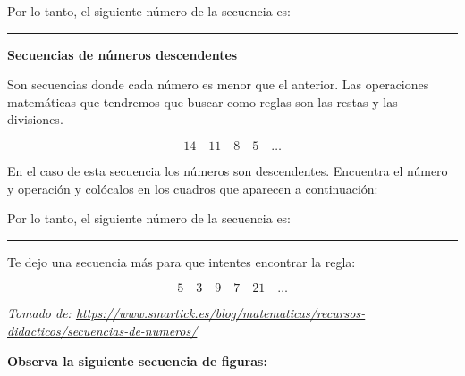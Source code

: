 \documentclass[12pt,a4paper]{article}
\begin{document}
\begin{tcolorbox}[colback=fondorosa,colframe=rojoclaro,title=MINI-EXPLICACIONES: SECUENCIAS DE NÚMEROS,breakable]
\begin{itemize}
    \vspace{0.5cm}

    Por lo tanto, el siguiente número de la secuencia es: \rule{2cm}{0.4pt}
\end{itemize}

\textbf{Secuencias de números descendentes}

Son secuencias donde cada número es menor que el anterior. Las operaciones matemáticas que tendremos que buscar como reglas son las restas y las divisiones.

\[ 14 \quad 11 \quad 8 \quad 5 \quad \ldots \]

En el caso de esta secuencia los números son descendentes. Encuentra el número y operación y colócalos en los cuadros que aparecen a continuación:

\vspace{0.5cm}

Por lo tanto, el siguiente número de la secuencia es: \rule{2cm}{0.4pt}

Te dejo una secuencia más para que intentes encontrar la regla:

\[ 5 \quad 3 \quad 9 \quad 7 \quad 21 \quad \ldots \]

\end{tcolorbox}

\textit{Tomado de: \url{https://www.smartick.es/blog/matematicas/recursos-didacticos/secuencias-de-numeros/}}

\vspace{1cm}

\textbf{Observa la siguiente secuencia de figuras:}
\end{document}
